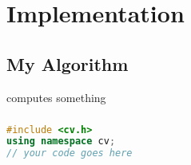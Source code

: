 \chapter{Implementation}

\section{My Algorithm}
\label{app:my_algorithm}
 computes something

\paragraph{}
\begin{lstlisting}[language=C++,showspaces=false,showstringspaces=false,breaklines=true, breakatwhitespace=true]
#include <cv.h>
using namespace cv;
// your code goes here

\end{lstlisting}
